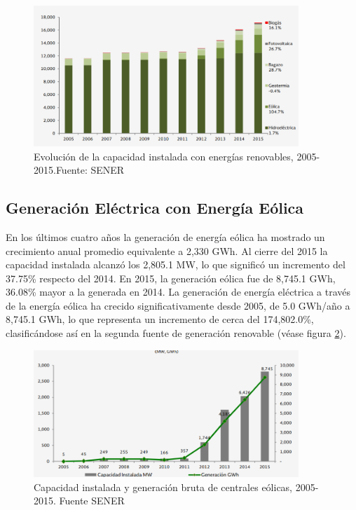 \begin{figure}[!h]
	\centering
	\includegraphics[width=10cm]{img/instalacion.png}
	\caption{Evolución de la capacidad instalada con energías renovables, 2005-2015.Fuente: SENER}
	\label{instalacion}
\end{figure}

\subsection{Generación Eléctrica con Energía Eólica}
En los últimos cuatro años la generación de energía eólica ha mostrado un crecimiento anual promedio equivalente a 2,330 GWh. Al cierre del 2015 la capacidad instalada alcanzó los 2,805.1 MW, lo que significó un incremento del 37.75\% respecto del 2014. En 2015, la generación eólica fue de 8,745.1 GWh, 36.08\% mayor a la generada en 2014. La generación de energía eléctrica a través de la energía eólica ha crecido significativamente desde 2005, de 5.0 GWh/año a 8,745.1 GWh, lo que representa un incremento de cerca del 174,802.0\%, clasificándose así en la segunda fuente de generación renovable (véase figura \ref{eolica}).

\begin{figure}[!h]
	\centering
	\includegraphics[width=10cm]{img/eolica.png}
	\caption{Capacidad instalada y generación bruta de centrales eólicas, 2005-2015. Fuente SENER}
	\label{eolica}
\end{figure}

